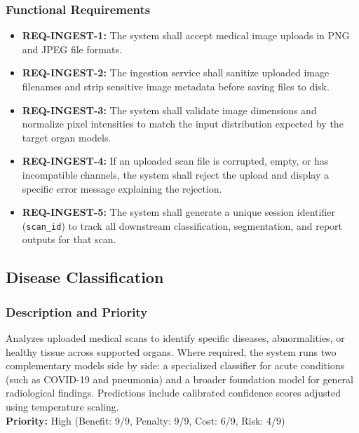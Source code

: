 \documentclass[12pt,a4paper]{report}
\begin{document}
\subsubsection{Functional Requirements}
\begin{itemize}
    \item \textbf{REQ-INGEST-1:} The system shall accept medical image uploads in PNG and JPEG file formats.
    \item \textbf{REQ-INGEST-2:} The ingestion service shall sanitize uploaded image filenames and strip sensitive image metadata before saving files to disk.
    \item \textbf{REQ-INGEST-3:} The system shall validate image dimensions and normalize pixel intensities to match the input distribution expected by the target organ models.
    \item \textbf{REQ-INGEST-4:} If an uploaded scan file is corrupted, empty, or has incompatible channels, the system shall reject the upload and display a specific error message explaining the rejection.
    \item \textbf{REQ-INGEST-5:} The system shall generate a unique session identifier (\texttt{scan\_id}) to track all downstream classification, segmentation, and report outputs for that scan.
\end{itemize}

\subsection{Disease Classification}
\subsubsection{Description and Priority}
Analyzes uploaded medical scans to identify specific diseases, abnormalities, or healthy tissue across supported organs. Where required, the system runs two complementary models side by side: a specialized classifier for acute conditions (such as COVID-19 and pneumonia) and a broader foundation model for general radiological findings. Predictions include calibrated confidence scores adjusted using temperature scaling.\\
\textbf{Priority:} High (Benefit: 9/9, Penalty: 9/9, Cost: 6/9, Risk: 4/9)
\end{document}
